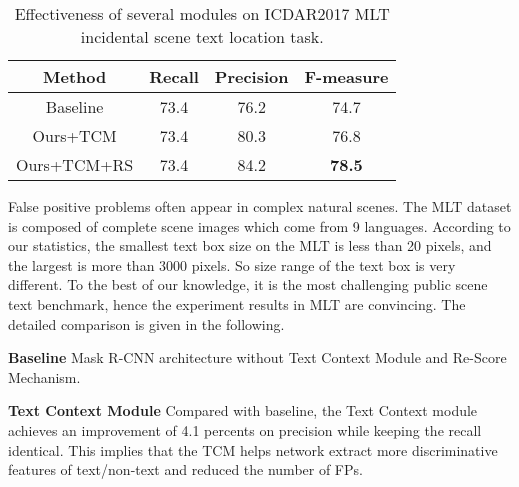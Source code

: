 \documentclass[letterpaper]{article} \usepackage{aaai19}  \usepackage{times}  \usepackage{helvet}  \usepackage{courier}  \usepackage{url}  \usepackage{graphicx}
\begin{document}
\begin{table}[htb]
\center
\begin{tabular}{|c|c|c|c|}
 \hline
Method & Recall & Precision & F-measure\\
 \hline
Baseline & 			73.4 & 76.2 & 74.7 \\
 \hline
Ours+TCM &			73.4 &80.3 &76.8 \\
\hline
Ours+TCM+RS &		73.4 &84.2 &\textbf{78.5} \\
\hline
\end{tabular}
\caption{\label{ablation}Effectiveness of several modules on ICDAR2017 MLT incidental scene text location task.}
\end{table}


False positive problems often appear in complex natural scenes. 
The MLT dataset is composed of complete scene images which come from 9 languages.
According to our statistics, the smallest text box size on the MLT is less than 20 pixels, and the largest is more than 3000 pixels. So size range of the text box is very different.
 To the best of our knowledge, it is the most challenging public scene text benchmark, hence the experiment results in MLT are convincing. 
The detailed comparison is given in the following.


\iffalse
\textbf{Multi-task Learning}
Our jointly trained network produces an detection F-measure of 75.4\%, which is 0.4\% higher than the result given by baseline network. This result illustrates that text detection can be improved with the multi-task loss used during training time.
\textbf{Pyramid Attention Module(PAM)}
Compared with the joint-trained model, the PAM module achieves an improvement of 1.1 percents.
This implies that the PAM module can effectively enhance text/non-text, thereby helping the network find some hard-to-detect text, such as small text, fuzzy text, etc.
\textbf{Pyramid Fusion Module(PFM)}
We also test the performance use PFM module based on the network with PAM. 
As illustrated in Fig.\ref{ablation}, our PFM improves the F-measure of 0.9\% based on PAM.
It suppresses the false positive samples at the same time helps PAM further improves detection capability.
\fi

\textbf{Baseline}
Mask R-CNN architecture without Text Context Module and Re-Score Mechanism.


\textbf{Text Context Module}
Compared with baseline, the Text Context module achieves an improvement of 4.1 percents on precision while keeping the recall  identical.
This implies that the TCM helps network extract more discriminative features of text/non-text and reduced the number of FPs.
\end{document}
